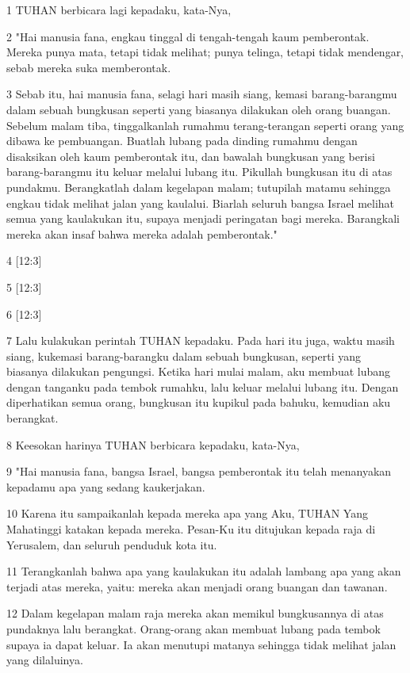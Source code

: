 \par 1 TUHAN berbicara lagi kepadaku, kata-Nya,
\par 2 "Hai manusia fana, engkau tinggal di tengah-tengah kaum pemberontak. Mereka punya mata, tetapi tidak melihat; punya telinga, tetapi tidak mendengar, sebab mereka suka memberontak.
\par 3 Sebab itu, hai manusia fana, selagi hari masih siang, kemasi barang-barangmu dalam sebuah bungkusan seperti yang biasanya dilakukan oleh orang buangan. Sebelum malam tiba, tinggalkanlah rumahmu terang-terangan seperti orang yang dibawa ke pembuangan. Buatlah lubang pada dinding rumahmu dengan disaksikan oleh kaum pemberontak itu, dan bawalah bungkusan yang berisi barang-barangmu itu keluar melalui lubang itu. Pikullah bungkusan itu di atas pundakmu. Berangkatlah dalam kegelapan malam; tutupilah matamu sehingga engkau tidak melihat jalan yang kaulalui. Biarlah seluruh bangsa Israel melihat semua yang kaulakukan itu, supaya menjadi peringatan bagi mereka. Barangkali mereka akan insaf bahwa mereka adalah pemberontak."
\par 4 [12:3]
\par 5 [12:3]
\par 6 [12:3]
\par 7 Lalu kulakukan perintah TUHAN kepadaku. Pada hari itu juga, waktu masih siang, kukemasi barang-barangku dalam sebuah bungkusan, seperti yang biasanya dilakukan pengungsi. Ketika hari mulai malam, aku membuat lubang dengan tanganku pada tembok rumahku, lalu keluar melalui lubang itu. Dengan diperhatikan semua orang, bungkusan itu kupikul pada bahuku, kemudian aku berangkat.
\par 8 Keesokan harinya TUHAN berbicara kepadaku, kata-Nya,
\par 9 "Hai manusia fana, bangsa Israel, bangsa pemberontak itu telah menanyakan kepadamu apa yang sedang kaukerjakan.
\par 10 Karena itu sampaikanlah kepada mereka apa yang Aku, TUHAN Yang Mahatinggi katakan kepada mereka. Pesan-Ku itu ditujukan kepada raja di Yerusalem, dan seluruh penduduk kota itu.
\par 11 Terangkanlah bahwa apa yang kaulakukan itu adalah lambang apa yang akan terjadi atas mereka, yaitu: mereka akan menjadi orang buangan dan tawanan.
\par 12 Dalam kegelapan malam raja mereka akan memikul bungkusannya di atas pundaknya lalu berangkat. Orang-orang akan membuat lubang pada tembok supaya ia dapat keluar. Ia akan menutupi matanya sehingga tidak melihat jalan yang dilaluinya.
